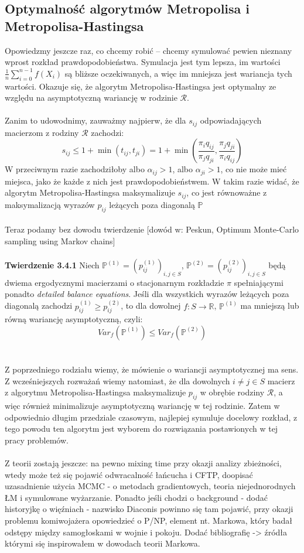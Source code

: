 \documentclass[a4paper]{article}
\begin{document}
\subsection{Optymalność algorytmów Metropolisa i Metropolisa-Hastingsa}
Opowiedzmy jeszcze raz, co chcemy robić – chcemy symulować pewien nieznany wprost rozkład prawdopodobieństwa. Symulacja jest tym lepsza, im wartości $\frac{1}{n}\sum\limits_{i = 0}^{n-1} f(X_i)$ są bliższe oczekiwanych, a więc im mniejsza jest wariancja tych wartości. Okazuje się, że algorytm Metropolisa-Hastingsa jest optymalny ze względu na asymptotyczną wariancję w rodzinie $\mathcal{R}$.\\\\
Zanim to udowodnimy, zauważmy najpierw, że dla $s_{ij}$ odpowiadających macierzom z rodziny $\mathcal{R}$ zachodzi:
$$s_{ij} \leq 1 + \min(t_{ij}, t_{ji}) = 1 + \min\left(\frac{\pi_i q_{ij}}{\pi_j q_{ji}}, \frac{\pi_j q_{ji}}{\pi_i q_{ij}}\right)$$
W przeciwnym razie zachodziłoby albo $\alpha_{ij} > 1$, albo $\alpha_{ji} > 1$, co nie może mieć miejsca, jako że każde z nich jest prawdopodobieństwem. W takim razie widać, że algorytm Metropolisa-Hastingsa maksymalizuje $s_{ij}$, co jest równoważne z maksymalizacją wyrazów $p_{ij}$ leżących poza diagonalą $\mathbb{P}$\\\\
Teraz podamy bez dowodu twierdzenie [dowód w: Peskun, Optimum Monte-Carlo sampling using Markov chains]\\
\\
\textbf{Twierdzenie 3.4.1}
Niech $\mathbb{P}^{(1)} = (p_{ij}^{(1)})_{i,j \in S}$, $\mathbb{P}^{(2)}= (p_{ij}^{(2)})_{i,j \in S}$ będą dwiema ergodycznymi macierzami o stacjonarnym rozkładzie $\pi$ spełniającymi ponadto \textit{detailed balance equations}. Jeśli dla wszystkich wyrazów leżących poza diagonalą zachodzi $p_{ij}^{(1)} \geq p_{ij}^{(2)}$, to dla dowolnej $f: S \to \mathbb{R}$,  $\mathbb{P}^{(1)}$ ma mniejszą lub równą wariancję asymptotyczną, czyli:
$$Var_f(\mathbb{P}^{(1)}) \leq Var_f(\mathbb{P}^{(2)})$$
\\\\
Z poprzedniego rodziału wiemy, że mówienie o wariancji asymptotycznej ma sens. Z wcześniejszych rozważań wiemy natomiast, że dla dowolnych $i \neq j \in S$ macierz z algorytmu Metropolisa-Hastingsa maksymalizuje $p_{ij}$ w obrębie rodziny $\mathcal{R}$, a więc również minimalizuje asymptotyczną wariancję w tej rodzinie. Zatem w odpowiednio długim przedziale czasowym, najlepiej symuluje docelowy rozkład, z tego powodu ten algorytm jest wyborem do rozwiązania postawionych w tej pracy problemów.\\\\
 Z teorii zostają jeszcze: na pewno mixing time przy okazji analizy zbieżności, wtedy może też się pojawić odwracalność łańcucha i CFTP, doopisać uzasadnienie użycia MCMC - o metodach gradientowych, teoria niejednorodnych ŁM i symulowane wyżarzanie. Ponadto jeśli chodzi o background - dodać historyjkę o więźniach - nazwisko Diaconis powinno się tam pojawić, przy okazji problemu komiwojażera opowiedzieć o P/NP, element nt. Markowa, który badał odstępy między samogłoskami w wojnie i pokoju. Dodać bibliografię -> źródła którymi się inspirowałem w dowodach teorii Markowa.
\end{document}

